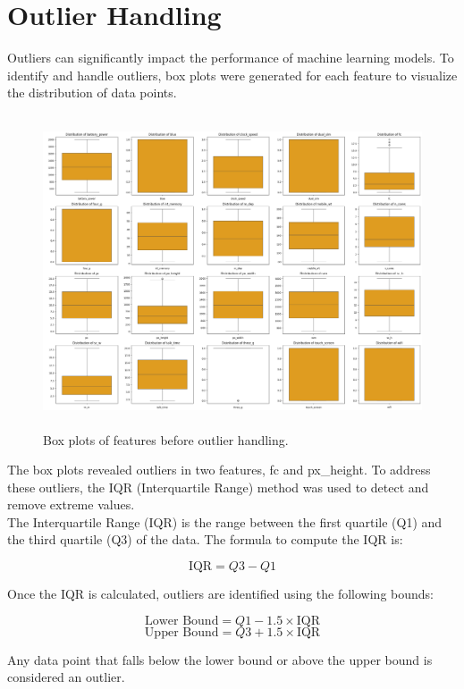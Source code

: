 \documentclass[12pt]{report}
\begin{document}
\section{Outlier Handling}
Outliers can significantly impact the performance of machine learning models. To identify and handle outliers, box plots were generated for each feature to visualize the distribution of data points. \\
\begin{figure}[H]
	\centering
	\includegraphics[height=25em]{box_plots_before.png}
	\caption{Box plots of features before outlier handling.}
	\label{box_plots_before}
\end{figure}
The box plots revealed outliers in two features, fc and px\_height. To address these outliers, the IQR (Interquartile Range) method was used to detect and remove extreme values. \\
The Interquartile Range (IQR) is the range between the first quartile (Q1) and the third quartile (Q3) of the data. The formula to compute the IQR is:

\[
\text{IQR} = Q3 - Q1
\]

Once the IQR is calculated, outliers are identified using the following bounds:

\[
\text{Lower Bound} = Q1 - 1.5 \times \text{IQR}
\]
\[
\text{Upper Bound} = Q3 + 1.5 \times \text{IQR}
\]

Any data point that falls below the lower bound or above the upper bound is considered an outlier.
\end{document}
